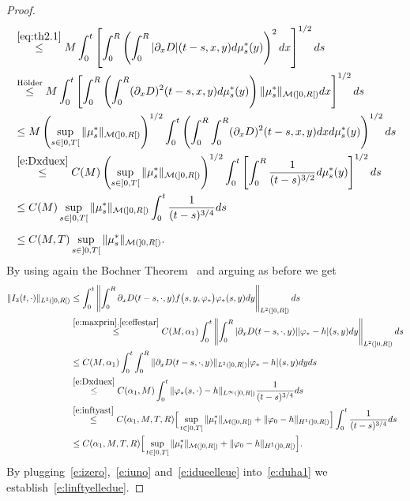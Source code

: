 \documentclass[11pt,leqno]{amsart}
\numberwithin{equation}{section}
\begin{document}
\begin{proof}
\begin{equation}
\begin{split}
    & 
     \stackrel{\eqref{eq:th2.1}}{\leq} 
    M 
    \int_0^t 
    \left[
    \int_0^R \left(
    \int_0^R  |\partial_x D|
    (t-s, x, y) d \mu^\ast_s (y) \right)^2 dx \right]^{1/2}   ds 
    \\
    & \stackrel{\text{H{\"o}lder}}{\leq}  
    M \int_0^t
    \left[
    \int_0^R
    \left(
    \int_0^R 
    (\partial_x 
    D)^2
     (t-s, x, y)  d 
     \mu^\ast_s (y) \right)
     \| \mu^\ast_s \|_{\mathcal M (]0, R[)} dx \right]^{1/2}   ds  \\ 
    & \leq 
    M 
    \left( \sup_{s \in ]0, T[}   \| \mu^\ast_s \|_{\mathcal M (]0, R[)} 
    \right)^{1/2}
    \int_0^t
    \left(  
    \int_0^R
    \int_0^R 
    (\partial_x 
    D)^2
     (t-s, x, y) dx   d 
     \mu^\ast_s (y) 
      \right)^{1/2}   ds  \\ 
     & 
     \stackrel{\eqref{e:Dxduex}}{\leq} 
     C(M) \left( \sup_{s \in ]0, T[}
      \| \mu^\ast_s \|_{\mathcal M (]0, R[)}  \right)^{1/2}
     \int_0^t \left[ \int_0^R \frac{1}{(t-s)^{3/2}} d \mu^\ast_s(y)  \right]^{1/2} ds \\ &
     \leq C(M) \sup_{s \in ]0, T[}
      \| \mu^\ast_s \|_{\mathcal M (]0, R[)}  
     \int_0^t  \frac{1}{(t-s)^{3/4}}  ds \\ &
     \leq  C(M, T) 
    \sup_{s \in ]0, T[}  \| \mu^\ast_s \|_{\mathcal M (]0, R[)}.   \phantom{\int}
\end{split}
\end{equation}
By using again the Bochner Theorem~\cite[p.473]{Salsa} and arguing as before 
we get  
\begin{equation}
  \label{e:idueelleue}
  \begin{split}
    \| I_3 (t, \cdot) \|_{L^2 (]0, R[)} & \leq \int_0^t \left\|
      \int_0^R \partial_x D(t-s, \cdot, y) f \big (s, y, {\varphi}_\ast
      \big)
      {\varphi}_\ast(s, y) dy \right\|_{L^2(]0, R[)} ds
    \\
    & \stackrel{\eqref{e:maxprin},\eqref{e:effestar}}{\leq} C(M,
    \alpha_1) \int_0^t \left\| \int_0^R | \partial_x D(t-s, \cdot, y)|
      | {\varphi}_\ast -h |(s, y) dy \right\|_{L^2(]0, R[)} ds
    \\
    & \leq
    C(M, \alpha_1) \int_0^t \int_0^R \| \partial_x D (t-s, \cdot, y)
    \|_{L^2 (]0, R[)} | {\varphi}_\ast -h |(s, y) dy ds
    \\
    & \stackrel{\eqref{e:Dxduex}}{\leq} C(\alpha_1, M) 
    \int_0^t \| {\varphi}_\ast(s,
    \cdot) -h \|_{L^\infty (]0, R[)}\frac{1}{(t-s)^{3/4}}
    ds
    \\
    & \stackrel{\eqref{e:inftyast}}{\leq} C(\alpha_1, M, T, R) \Big[
    \sup_{t \in ]0, T[} \| \mu_t^\ast \|_{\mathcal M (]0, R[)} + \|
    {\varphi}_0 - h \|_{H^1(]0, R[)} \Big] \int_0^t \frac{1}{(t-s)^{3/4}}
    ds
    \\
    & \leq C(\alpha_1, M, T, R) \Big[ \sup_{t \in ]0, T[} \|
    \mu_t^\ast \|_{\mathcal M (]0, R[)} + \| {\varphi}_0 - h \|_{H^1 (]0,
      R[)} \Big].
  \end{split}
\end{equation}
By plugging~\eqref{e:izero},~\eqref{e:iuno} and~\eqref{e:idueelleue} into~\eqref{e:duha1} we establish~\eqref{e:linftyelledue}. 
\end{proof}
\end{document}
